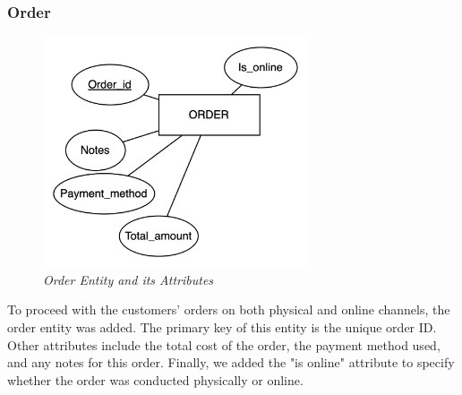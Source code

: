 \documentclass[11pt]{article}
\begin{document}
\subsubsection{Order}
\begin{figure}[H]
  \centering
  \includegraphics[width=0.7\textwidth]{images/entities/order.png}
  \caption{\textit{Order Entity and its Attributes}}
\end{figure}

To proceed with the customers' orders on both physical and online channels, the order entity was added. The primary key of this entity is the unique order ID. Other attributes include the total cost of the order, the payment method used, and any notes for this order. Finally, we added the "is online" attribute to specify whether the order was conducted physically or online.
\end{document}
